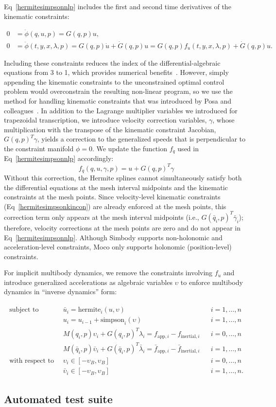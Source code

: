 \documentclass[10pt,letterpaper]{article}
\newcommand{\hermitesimpsonkincon}{
    \begin{align}
        0 &= \dot{\phi}(q, u, p) = G(q, p) u, \label{hermitesimpsonkincon} \\
        0 &= \ddot{\phi}(t, y, x, \lambda, p) = G(q, p) \dot{u} + \dot{G}(q, p) u = G(q, p) f_{\dot{u}}(t, y, x, \lambda, p) + \dot{G}(q, p) u.
    \end{align}
}
\newcommand{\hermitesimpsonimplicit}{
\begin{align}
    \begin{aligned}
    \mbox{subject to} \quad
         & \bar{u}_i = \textrm{hermite}_i(u, \upsilon) && i = 1, \ldots, n \\
         & u_i = u_{i-1} + \textrm{simpson}_i(\upsilon)  && i = 1, \ldots, n \\
         & M(q_i, p)\upsilon_i + G(q_i, p)^T \lambda_i =
          f_{\textrm{app},i} -
            f_{\textrm{inertial},i} && i = 0, \ldots, n \\
         & M(\bar{q}_i, p)\bar{\upsilon}_i + G(\bar{q}_i, p)^T \bar{\lambda}_i =
          \bar{f}_{\textrm{app},i} -
            \bar{f}_{\textrm{inertial},i} && i = 1, \ldots, n \\
    \mbox{with respect to} \quad
         & \upsilon_i \in [-\upsilon_{B}, \upsilon_{B}] && i = 0, \ldots, n \\
         & \bar{\upsilon}_i \in [-\upsilon_{B}, \upsilon_{B}] && i = 1, \ldots, n.
    \end{aligned}
\end{align}
}
\begin{document}
Eq~\ref{hermitesimpsonnlp} includes the first and second time derivatives of the kinematic constraints:
\hermitesimpsonkincon
Including these constraints reduces the index of the differential-algebraic equations from 3 to 1, which provides numerical benefits~\cite{Hairer:1996,Campbell:2016,Betts:2010}. However, simply appending the kinematic constraints to the unconstrained optimal control problem would overconstrain the resulting non-linear program, so we use the method for handling kinematic constraints that was introduced by Posa and colleagues~\cite{Posa:2016}. In addition to the Lagrange multiplier variables we introduced for trapezoidal transcription, we introduce velocity correction variables, $\gamma$, whose multiplication with the transpose of the kinematic constraint Jacobian, $G(q, p)^T \gamma$, yields a correction to the generalized speeds that is perpendicular to the constraint manifold $\phi = 0$. We update the function $f_{\dot{q}}$ used in Eq~\ref{hermitesimpsonnlp} accordingly:
\begin{equation}
f_{\dot{q}}(q, u, \gamma, p) = u + G(q, p)^T \gamma
\end{equation}
Without this correction, the Hermite splines cannot simultaneously satisfy both the differential equations at the mesh interval midpoints and the kinematic constraints at the mesh points. Since velocity-level kinematic constraints (Eq~\ref{hermitesimpsonkincon}) are already enforced at the mesh points, this correction term only appears at the mesh interval midpoints (i.e., $G(\bar{q}_i, p)^T \bar{\gamma}_i$); therefore, velocity corrections at the mesh points are zero and do not appear in Eq~\ref{hermitesimpsonnlp}. Although Simbody supports non-holonomic and acceleration-level constraints, Moco only supports holonomic (position-level) constraints.

For implicit multibody dynamics, we remove the constraints involving $f_{\dot{u}}$ and introduce generalized accelerations as algebraic variables $\upsilon$ to enforce multibody dynamics in “inverse dynamics” form:
\hermitesimpsonimplicit

\subsection*{Automated test suite}
\end{document}
